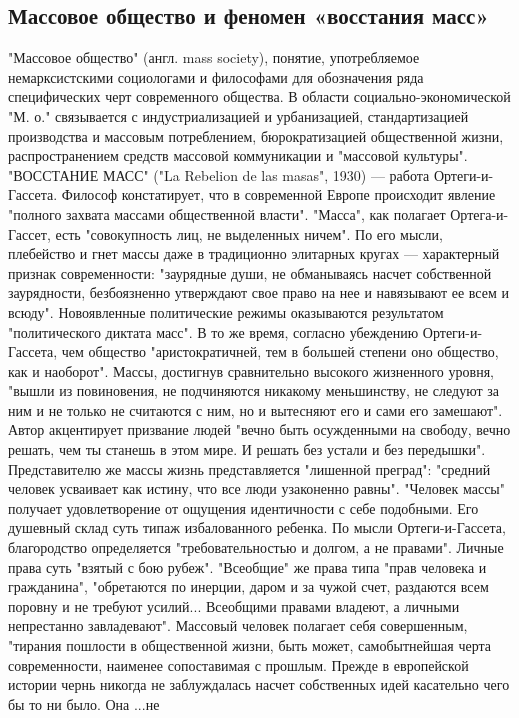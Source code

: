\documentclass[12pt]{article}
\begin{document}
\subsection{Массовое общество и феномен «восстания масс»}
"Массовое общество" (англ. mass society), понятие, употребляемое немарксистскими социологами и
философами для обозначения ряда специфических черт современного общества. В области социально-экономической "М. о." связывается с индустриализацией и урбанизацией, стандартизацией производства и 
массовым потреблением, бюрократизацией общественной жизни, распространением средств массовой
коммуникации и "массовой культуры".
"ВОССТАНИЕ МАСС" ("La Rebelion de las masas", 1930) — работа Ортеги-и-Гассета. Философ констатирует,
что в современной Европе происходит явление "полного захвата массами общественной власти". "Масса", как
полагает Ортега-и-Гассет, есть "совокупность лиц, не выделенных ничем". По его мысли, плебейство и гнет
массы даже в традиционно элитарных кругах — характерный признак современности: "заурядные души, не
обманываясь насчет собственной заурядности, безбоязненно утверждают свое право на нее и навязывают ее
всем и всюду". Новоявленные политические режимы оказываются результатом "политического диктата масс". В
то же время, согласно убеждению Ортеги-и-Гассета, чем общество "аристократичней, тем в большей степени
оно общество, как и наоборот". Массы, достигнув сравнительно высокого жизненного уровня, "вышли из
повиновения, не подчиняются никакому меньшинству, не следуют за ним и не только не считаются с ним, но и
вытесняют его и сами его замешают". Автор акцентирует призвание людей "вечно быть осужденными на
свободу, вечно решать, чем ты станешь в этом мире. И решать без устали и без передышки". Представителю же
массы жизнь представляется "лишенной преград": "средний человек усваивает как истину, что все люди
узаконенно равны". "Человек массы" получает удовлетворение от ощущения идентичности с себе подобными.
Его душевный склад суть типаж избалованного ребенка. По мысли Ортеги-и-Гассета, благородство
определяется "требовательностью и долгом, а не правами". Личные права суть "взятый с бою рубеж".
"Всеобщие" же права типа "прав человека и гражданина", "обретаются по инерции, даром и за чужой счет,
раздаются всем поровну и не требуют усилий... Всеобщими правами владеют, а личными непрестанно
завладевают". Массовый человек полагает себя совершенным, "тирания пошлости в общественной жизни, быть
может, самобытнейшая черта современности, наименее сопоставимая с прошлым. Прежде в европейской
истории чернь никогда не заблуждалась насчет собственных идей касательно чего бы то ни было. Она ...не
\end{document}
